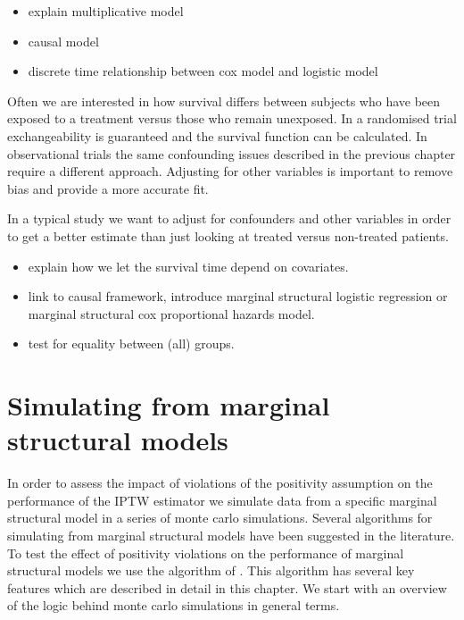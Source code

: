 \documentclass[11pt]{article}
\providecommand{\tightlist}{%
      \setlength{\itemsep}{0pt}\setlength{\parskip}{0pt}}
\begin{document}
\begin{itemize}
\tightlist
\item
  explain multiplicative model
\item
  causal model
\item
  discrete time relationship between cox model and logistic model
\end{itemize}

Often we are interested in how survival differs between subjects who
have been exposed to a treatment versus those who remain unexposed. In a
randomised trial exchangeability is guaranteed and the survival function
can be calculated. In observational trials the same confounding issues
described in the previous chapter require a different approach.
Adjusting for other variables is important to remove bias and provide a
more accurate fit.

In a typical study we want to adjust for confounders and other variables
in order to get a better estimate than just looking at treated versus
non-treated patients.

\begin{itemize}
\tightlist
\item
  explain how we let the survival time depend on covariates.
\item
  link to causal framework, introduce marginal structural logistic
  regression or marginal structural cox proportional hazards model.
\item
  test for equality between (all) groups.
\end{itemize}

    \newpage

    \section{Simulating from marginal structural
models}\label{simulating-from-marginal-structural-models}

In order to assess the impact of violations of the positivity assumption
on the performance of the IPTW estimator we simulate data from a
specific marginal structural model in a series of monte carlo
simulations. Several algorithms for simulating from marginal structural
models have been suggested in the literature. To test the effect of
positivity violations on the performance of marginal structural models
we use the algorithm of \citet{Havercroft2010}. This algorithm has
several key features which are described in detail in this chapter. We
start with an overview of the logic behind monte carlo simulations in
general terms.
\end{document}
